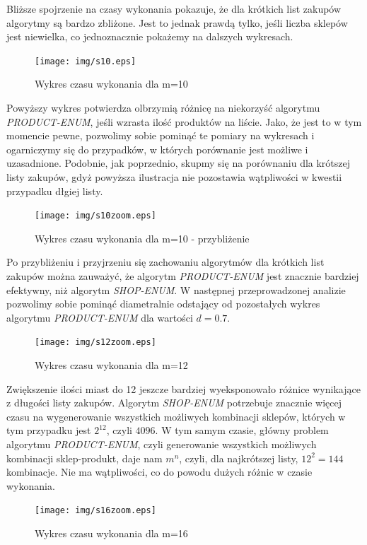 \documentclass[a4paper]{article}
\begin{document}
Bliższe spojrzenie na czasy wykonania pokazuje, że dla krótkich list zakupów algorytmy są bardzo zbliżone. Jest to jednak prawdą tylko, jeśli liczba sklepów jest niewielka, co jednoznacznie pokażemy na dalszych wykresach.

\begin{figure}[H]
\centering
\texttt{[image: img/s10.eps]}
\caption{Wykres czasu wykonania dla m=10}
\end{figure}

Powyższy wykres potwierdza olbrzymią różnicę na niekorzyść algorytmu \textit{PRODUCT-ENUM}, jeśli wzrasta ilość produktów na liście. Jako, że jest to w tym momencie pewne, pozwolimy sobie pominąć te pomiary na wykresach i ogarniczymy się do przypadków, w których porównanie jest możliwe i uzasadnione. Podobnie, jak poprzednio, skupmy się na porównaniu dla krótszej listy zakupów, gdyż powyższa ilustracja nie pozostawia wątpliwości w kwestii przypadku dłgiej listy.

\begin{figure}[H]
\centering
\texttt{[image: img/s10zoom.eps]}
\caption{Wykres czasu wykonania dla m=10 - przybliżenie}
\end{figure}

Po przybliżeniu i przyjrzeniu się zachowaniu algorytmów dla krótkich list zakupów można zauważyć, że algorytm \textit{PRODUCT-ENUM} jest znacznie bardziej efektywny, niż algorytm \textit{SHOP-ENUM}. W następnej przeprowadzonej analizie pozwolimy sobie pominąć diametralnie odstający od pozostałych wykres algorytmu \textit{PRODUCT-ENUM} dla wartości $d=0.7$.

\begin{figure}[H]
\centering
\texttt{[image: img/s12zoom.eps]}
\caption{Wykres czasu wykonania dla m=12}
\end{figure}

Zwiększenie ilości miast do 12 jeszcze bardziej wyeksponowało różnice wynikające z długości listy zakupów. Algorytm \textit{SHOP-ENUM} potrzebuje znacznie więcej czasu na wygenerowanie wszystkich możliwych kombinacji sklepów, których w tym przypadku jest $2^12$, czyli $4096$. W tym samym czasie, główny problem algorytmu \textit{PRODUCT-ENUM}, czyli generowanie wszystkich możliwych kombinacji sklep-produkt, daje nam $m^n$, czyli, dla najkrótszej listy, $12^2=144$ kombinacje. Nie ma wątpliwości, co do powodu dużych różnic w czasie wykonania.

\begin{figure}[H]
\centering
\texttt{[image: img/s16zoom.eps]}
\caption{Wykres czasu wykonania dla m=16}
\end{figure}
\end{document}
